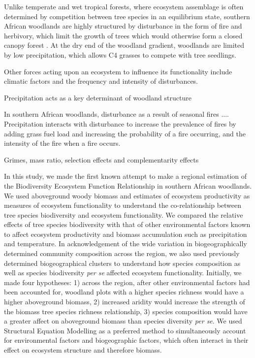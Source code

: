 \documentclass[12pt,english,a4paper]{report}
\begin{document}
Unlike temperate and wet tropical forests, where ecosystem assemblage is often determined by competition between tree species in an equilibrium state, southern African woodlands are highly structured by disturbance in the form of fire and herbivory, which limit the growth of trees which would otherwise form a closed canopy forest \citep{}. At the dry end of the woodland gradient, woodlands are limited by low precipitation, which allows C4 grasses to compete with tree seedlings.

Other forces acting upon an ecosystem to influence its functionality include climatic factors and the frequency and intensity of disturbances.

Precipitation acts as a key determinant of woodland structure

In southern African woodlands, disturbance as a result of seasonal fires .... Precipitation interacts with disturbance to increase the prevalence of fires by adding grass fuel load and increasing the probability of a fire occurring, and the intensity of the fire when a fire occurs.

Grimes, mass ratio, selection effects and complementarity effects 

In this study, we made the first known attempt to make a regional estimation of the Biodiversity Ecosystem Function Relationship in southern African woodlands. We used aboveground woody biomass and estimates of ecosystem productivity as measures of ecosystem functionality to understand the co-relationship between tree species biodiversity and ecosystem functionality. We compared the relative effects of tree species biodiversity with that of other environmental factors known to affect ecosystem productivity and biomass accumulation such as precipitation and temperature. In acknowledgement of the wide variation in biogeographically determined community composition across the region, we also used previously determined biogeographical clusters \citep{} to understand how species composition as well as species biodiversity \textit{per se} affected ecosystem functionality. Initially, we made four hypotheses: 1) across the region, after other environmental factors had been accounted for, woodland plots with a higher species richness would have a higher aboveground biomass, 2) increased aridity would increase the strength of the biomass tree species richness relationship, 3) species composition would have a greater affect on aboveground biomass than species diversity \textit{per se}. We used Structural Equation Modelling as a preferred method to simultaneously account for environmental factors and biogeographic factors, which often interact in their effect on ecosystem structure and therefore biomass. 
\end{document}

